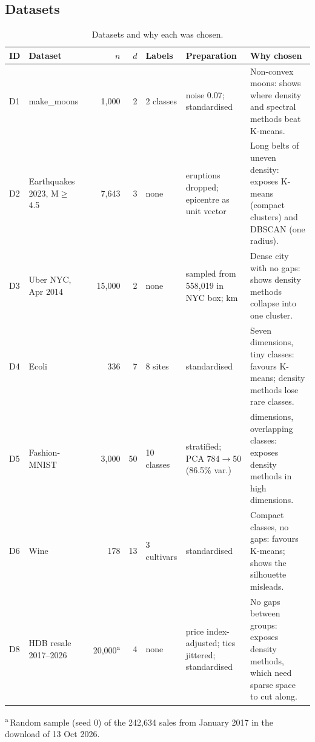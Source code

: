 \subsection{Datasets}\label{sec:data}


\begin{table}[h]\centering\footnotesize
\caption{Datasets and why each was chosen.}
\label{tab:data}
\begin{tabularx}{\textwidth}{@{}l>{\raggedright\arraybackslash}Xrrl>{\raggedright\arraybackslash}X>{\raggedright\arraybackslash}X@{}}
\toprule
\textbf{ID} & \textbf{Dataset} & \textbf{$n$} & \textbf{$d$} & \textbf{Labels} & \textbf{Preparation} & \textbf{Why chosen} \\
\midrule
D1 & make\_moons~\cite{pedregosa2011} & 1{,}000 & 2 & 2 classes & noise 0.07; standardised & Non-convex moons: shows where density and spectral methods beat K-means. \\
D2 & Earthquakes 2023, M$\geq$4.5~\cite{usgs2017} & 7{,}643 & 3 & none & 8 eruptions dropped; epicentre as unit vector & Long belts of uneven density: exposes K-means (compact clusters) and DBSCAN (one radius). \\
D3 & Uber NYC, Apr 2014~\cite{fivethirtyeight2014} & 15{,}000 & 2 & none & sampled from 558{,}019 in NYC box; km & Dense city with no gaps: shows density methods collapse into one cluster. \\
D4 & Ecoli~\cite{horton1996} & 336 & 7 & 8 sites & standardised & Seven dimensions, tiny classes: favours K-means; density methods lose rare classes. \\
D5 & Fashion-MNIST~\cite{xiao2017} & 3{,}000 & 50 & 10 classes & stratified; PCA 784$\to$50 (86.5\% var.) & 50 dimensions, overlapping classes: exposes density methods in high dimensions. \\
D6 & Wine~\cite{aeberhard1991} & 178 & 13 & 3 cultivars & standardised & Compact classes, no gaps: favours K-means; shows the silhouette misleads. \\
D8 & HDB resale 2017--2026~\cite{hdb2026} & 20{,}000\textsuperscript{a} & 4 & none & price index-adjusted; ties jittered; standardised & No gaps between groups: exposes density methods, which need sparse space to cut along. \\
\bottomrule
\end{tabularx}
\par\raggedright\footnotesize\textsuperscript{a}\,Random sample (seed 0) of the 242{,}634 sales from January 2017 in the download of 13 Oct 2026.
\end{table}

